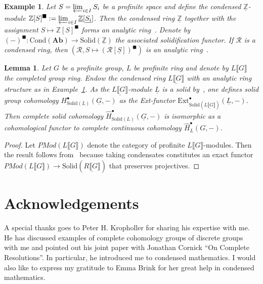 \documentclass[12pt,a4paper]{article}
\numberwithin{equation}{section}
\newtheorem{lem}[thm]{Lemma}
\newtheorem{exl}[thm]{Example}
\theoremstyle{nonumberplain}
\newtheorem{proof}{Proof}
\begin{document}
\begin{exl}\label{exl:analyticrings}
Let $S = \varprojlim_{i \in I} S_i$ be a profinite space and define the condensed $\underline{\mathbb{Z}}$-module $\mathbb{Z}[S]^{\blacksquare} := \varprojlim_{i \in I} \underline{\mathbb{Z}}[\underline{S_i}]$. Then the condensed ring $\underline{\mathbb{Z}}$ together with the assignment $S \mapsto \mathbb{Z}[S]^{\blacksquare}$ forms an analytic ring~\cite[p.~46]{sch19}. Denote by $(-)^{\blacksquare}: \mathrm{Cond}(\mathbf{Ab}) \rightarrow \mathrm{Solid}(\underline{\mathbb{Z}})$ the associated solidification functor. If $\mathcal{R}$ is a condensed ring, then $(\mathcal{R}, S \mapsto (\mathcal{R}[\underline{S}])^{\blacksquare})$ is an analytic ring~\cite[Proposition~3.6]{tan24}.
\end{exl}

\begin{lem}\label{lem:solidandctscohom}
Let $G$ be a profinite group, $L$ be profinite ring and denote by $L\llbracket G \rrbracket$ the completed group ring. Endow the condensed ring $\underline{L\llbracket G \rrbracket}$ with an analytic ring structure as in Example~\ref{exl:analyticrings}. As the $\underline{L\llbracket G \rrbracket}$-module $\underline{L}$ is a solid by~\cite[pp.~14--15]{tan24}, one defines solid group cohomology $H_{\mathrm{Solid}(L)}^{\bullet}(\underline{G}, -)$ as the Ext-functor $\mathrm{Ext}_{\mathrm{Solid}(\underline{L\llbracket G \rrbracket})}^{\bullet}(\underline{L}, -)$. Then complete solid cohomology $\widehat{H}_{\mathrm{Solid}(L)}^{\bullet}(\underline{G}, -)$ is isomorphic as a cohomological functor to complete continuous cohomology $\widehat{H}_L^{\bullet}(G, -)$.
\end{lem}

\begin{proof}
Let $PMod(L\llbracket G \rrbracket)$ denote the category of profinite $L\llbracket G \rrbracket$-modules. Then the result follows from~\cite[Theorem~3.14]{tan24} because taking condensates constitutes an exact functor $PMod(L\llbracket G \rrbracket) \rightarrow \mathrm{Solid}(\underline{R\llbracket G \rrbracket})$ that preserves projectives.
\end{proof}

\section*{Acknowledgements}

A special thanks goes to Peter H. Kropholler for sharing his expertise with me. He has discussed examples of complete cohomology groups of discrete groups with me and pointed out his joint paper with Jonathan Cornick ``On Complete Resolutions''. In particular, he introduced me to condensed mathematics. I would also like to express my gratitude to Emma Brink for her great help in condensed mathematics. \\
\end{document}
